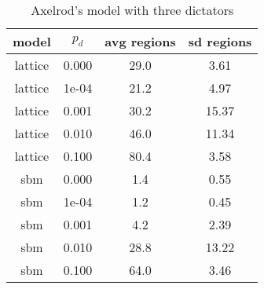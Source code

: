 
\begin{table}[htbp]
\centering
\caption{Axelrod's model with three dictators}
\begin{tabular}{cccc}
  
model & $p_d$ & avg regions & sd regions \\ 
\midrule
lattice & 0.000 & 29.0 & 3.61\\
lattice & 1e-04 & 21.2 & 4.97\\
lattice & 0.001 & 30.2 & 15.37\\
lattice & 0.010 & 46.0 & 11.34\\
lattice & 0.100 & 80.4 & 3.58\\
sbm & 0.000 & 1.4 & 0.55\\
sbm & 1e-04 & 1.2 & 0.45\\
sbm & 0.001 & 4.2 & 2.39\\
sbm & 0.010 & 28.8 & 13.22\\
sbm & 0.100 & 64.0 & 3.46\\
\bottomrule
\end{tabular}

\label{tab:mont}
\end{table}
